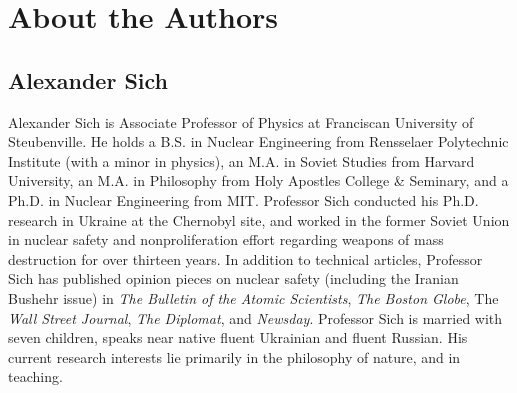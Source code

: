 \chapter{About the Authors}

\section*{Alexander Sich}

Alexander Sich is Associate Professor of Physics at Franciscan University of Steubenville. He holds a B.S. in Nuclear Engineering from Rensselaer Polytechnic Institute (with a minor in physics), an M.A. in Soviet Studies from Harvard University, an M.A. in Philosophy from Holy Apostles College \& Seminary, and a Ph.D. in Nuclear Engineering from MIT. Professor Sich conducted his Ph.D. research in Ukraine at the Chernobyl site, and worked in the former Soviet Union in nuclear safety and nonproliferation effort regarding weapons of mass destruction for over thirteen years. In addition to technical articles, Professor Sich has published opinion pieces on nuclear safety (including the Iranian Bushehr issue) in \emph{The Bulletin of the Atomic Scientists}, \emph{The Boston Globe}, The \emph{Wall Street Journal}, \emph{The Diplomat}, and \emph{Newsday}. Professor Sich is married with seven children, speaks near native fluent Ukrainian and fluent Russian. His current research interests lie primarily in the philosophy of nature, and in teaching.

